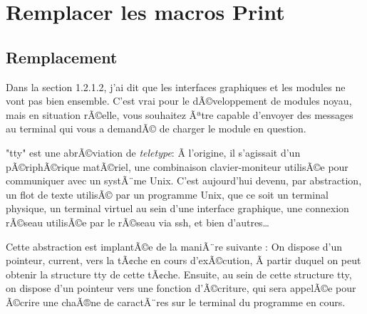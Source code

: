 \documentclass[11pt]{article}
\begin{document}
\section*{Remplacer les macros Print}
\label{sec-13}

\subsection*{Remplacement}
\label{sec-13-1}
Dans la section 1.2.1.2, j'ai dit que les interfaces graphiques et les modules ne vont pas bien ensemble. C'est vrai pour le dÃ©veloppement de modules noyau, mais en situation rÃ©elle, vous souhaitez Ãªtre capable d'envoyer des messages au terminal qui vous a demandÃ© de charger le module en question.

"tty" est une abrÃ©viation de \emph{teletype}: Ã  l'origine, il s'agissait d'un pÃ©riphÃ©rique matÃ©riel, une combinaison clavier-moniteur utilisÃ©e pour communiquer avec un systÃ¨me Unix. C'est aujourd'hui devenu, par abstraction, un flot de texte utilisÃ© par un programme Unix, que ce soit un terminal physique, un terminal virtuel au sein d'une interface graphique, une connexion rÃ©seau utilisÃ©e par le rÃ©seau via ssh, et bien d'autres\ldots{}

Cette abstraction est implantÃ©e de la maniÃ¨re suivante : On dispose d'un pointeur, current, vers la tÃ¢che en cours d'exÃ©cution, Ã  partir duquel on peut obtenir la structure tty de cette tÃ¢che. Ensuite, au sein de cette structure tty, on dispose d'un pointeur vers une fonction d'Ã©criture, qui sera appelÃ©e pour Ã©crire une chaÃ®ne de caractÃ¨res sur le terminal du programme en cours.
\end{document}
